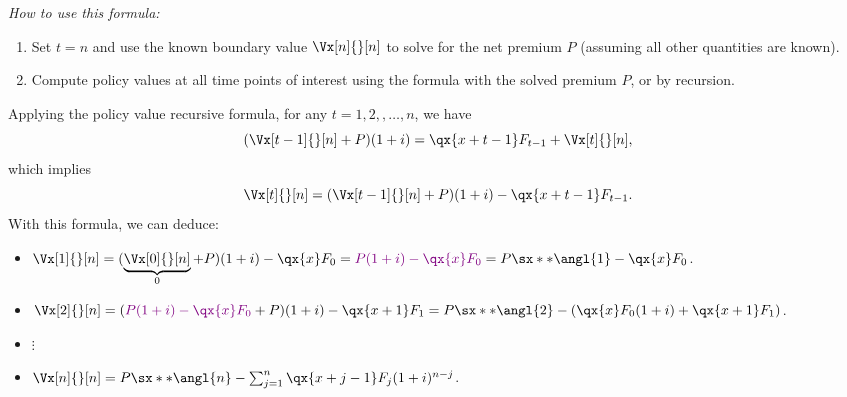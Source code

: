\begin{enumerate}
\begin{enumerate}[label={(\arabic*)}]
\begin{itemize}
\begin{itemize}
\emph{How to use this formula:}
\begin{enumerate}[label={(\arabic*)}]
\item Set \(t=n\) and use the known boundary value \(\Vx[n]{}[n]\) to solve for
the net premium \(P\) (assuming all other quantities are known).
\item Compute policy values at all time points of interest using the formula
with the solved premium \(P\), or by recursion.
\end{enumerate}
\begin{pf}
Applying the policy value recursive formula, for any \(t=1,2,,\dotsc,n\), we
have
\[
(\Vx[t-1]{}[n]+P)(1+i)=\qx{x+t-1}F_{t-1}+\Vx[t]{}[n],
\]
which implies
\[
\Vx[t]{}[n]=(\Vx[t-1]{}[n]+P)(1+i)-\qx{x+t-1}F_{t-1}.
\]
With this formula, we can deduce:
\begin{itemize}
\item \(\Vx[1]{}[n]=(\underbrace{\Vx[0]{}[n]}_{0}+P)(1+i)-\qx{x}F_{0}
=\vc{P(1+i)-\qx{x}F_0}=P\sx**{\angl{1}}-\qx{x}F_0\).
\item \(\Vx[2]{}[n]=(\vc{P(1+i)-\qx{x}F_0}+P)(1+i)-\qx{x+1}F_{1}
=P\sx**{\angl{2}}-(\qx{x}F_0(1+i)+\qx{x+1}F_1)\).
\item \(\vdots\)
\item \(\Vx[n]{}[n]=P\sx**{\angl{n}}-\sum_{j=1}^{n}\qx{x+j-1}F_{j}(1+i)^{n-j}\).
\end{itemize}
\end{pf}
\end{itemize}
\end{itemize}
\end{enumerate}

\end{enumerate}
